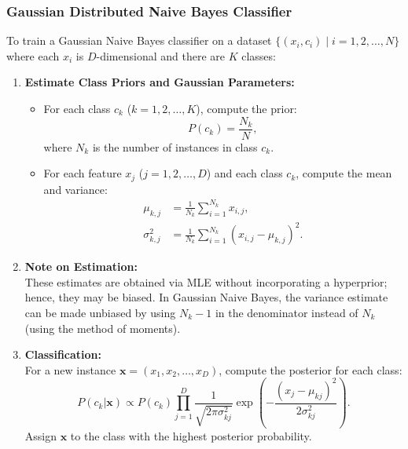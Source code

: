 \documentclass[12pt]{article}
\begin{document}
\subsubsection{Gaussian Distributed Naive Bayes Classifier}
To train a Gaussian Naive Bayes classifier on a dataset \(\{(x_i, c_i) \mid i = 1, 2, \dots, N\}\) where each \(x_i\) is \(D\)-dimensional and there are \(K\) classes:
\begin{enumerate}
    \item \textbf{Estimate Class Priors and Gaussian Parameters:}
    \begin{itemize}
        \item For each class \(c_k\) (\(k = 1, 2, \dots, K\)), compute the prior:
        $$
        P(c_k) = \frac{N_k}{N},
        $$
        where \(N_k\) is the number of instances in class \(c_k\).
        \item For each feature \(x_j\) (\(j = 1, 2, \dots, D\)) and each class \(c_k\), compute the mean and variance:
        \begin{align}
        \mu_{k,j} &= \frac{1}{N_k}\sum_{i=1}^{N_k} x_{i,j}, \\
        \sigma_{k,j}^2 &= \frac{1}{N_k}\sum_{i=1}^{N_k} \left(x_{i,j} - \mu_{k,j}\right)^2.
        \end{align}
    \end{itemize}
    \item \textbf{Note on Estimation:} \\
    These estimates are obtained via MLE without incorporating a hyperprior; hence, they may be biased. In Gaussian Naive Bayes, the variance estimate can be made unbiased by using \(N_k - 1\) in the denominator instead of \(N_k\) (using the method of moments).
    \item \textbf{Classification:} \\
    For a new instance \(\bm{x} = (x_1, x_2, \dots, x_D)\), compute the posterior for each class:
    $$
    P(c_k|\bm{x}) \propto P(c_k) \prod_{j=1}^{D} \frac{1}{\sqrt{2\pi\sigma_{kj}^2}}\exp\left(-\frac{(x_j - \mu_{kj})^2}{2\sigma_{kj}^2}\right).
    $$
    Assign \(\bm{x}\) to the class with the highest posterior probability.
\end{enumerate}
\end{document}
